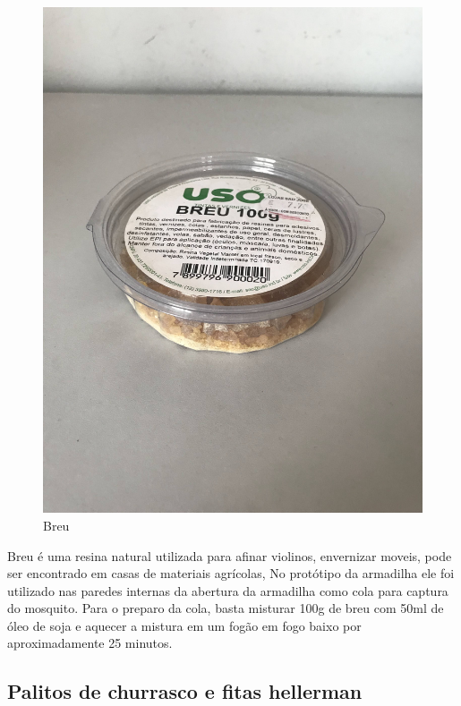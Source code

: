 \documentclass[
	12pt,				%
	openright,			%
	oneside,			%
	a4paper,			%
	chapter=TITLE,		%
	english,			%
	brazil				%
	]{abntex2}
\begin{document}
\begin{figure}[H]
    \centering
    \includegraphics[scale=0.04, angle=-90]{imagens/IMG_0601.jpg}
    \caption{Breu}
    \label{fig:breu}
\end{figure}   

Breu é uma resina natural utilizada para afinar violinos, envernizar moveis, pode ser encontrado em casas de materiais agrícolas, 
No protótipo da armadilha ele foi 
utilizado nas paredes internas da abertura da armadilha como cola para captura do mosquito. Para o preparo da cola, basta misturar 
100g de breu com 50ml de óleo de soja 
e aquecer a mistura em um fogão em fogo baixo por aproximadamente 25 minutos.

\subsection{Palitos de churrasco e fitas hellerman}
\end{document}
